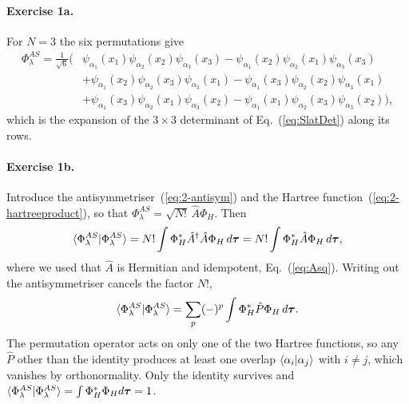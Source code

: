 \paragraph{Exercise 1a.}
For $N=3$ the six permutations give
\begin{align}
  \Phi_{\lambda}^{AS} = \frac{1}{\sqrt{6}}\Big(
  &\psi_{\alpha_1}(x_1)\psi_{\alpha_2}(x_2)\psi_{\alpha_3}(x_3)
  -\psi_{\alpha_1}(x_2)\psi_{\alpha_2}(x_1)\psi_{\alpha_3}(x_3)\nonumber\\
  &+\psi_{\alpha_1}(x_2)\psi_{\alpha_2}(x_3)\psi_{\alpha_3}(x_1)
  -\psi_{\alpha_1}(x_3)\psi_{\alpha_2}(x_2)\psi_{\alpha_3}(x_1)\nonumber\\
  &+\psi_{\alpha_1}(x_3)\psi_{\alpha_2}(x_1)\psi_{\alpha_3}(x_2)
  -\psi_{\alpha_1}(x_1)\psi_{\alpha_2}(x_3)\psi_{\alpha_3}(x_2)\Big),
  \label{eq:2-w35a}
\end{align}
which is the expansion of the $3\times3$ determinant of
Eq.~(\ref{eq:SlatDet}) along its rows.

\paragraph{Exercise 1b.}
Introduce the antisymmetriser~(\ref{eq:2-antisym}) and the Hartree
function~(\ref{eq:2-hartreeproduct}), so that
$\Phi^{AS}_{\lambda}=\sqrt{N!}\,\hat{A}\Phi_H$.  Then
\begin{equation}
  \langle \Phi^{AS}_{\lambda} \vert \Phi^{AS}_{\lambda} \rangle
   = N!\int \Phi_H^{*}\hat{A}^{\dagger}\hat{A}\Phi_H\,d\bm{\tau}
   = N!\int \Phi_H^{*}\hat{A}\Phi_H\,d\bm{\tau} ,
  \label{eq:2-w35b1}
\end{equation}
where we used that $\hat{A}$ is Hermitian and idempotent,
Eq.~(\ref{eq:Asq}).  Writing out the antisymmetriser cancels the factor $N!$,
\begin{equation}
  \langle \Phi^{AS}_{\lambda} \vert \Phi^{AS}_{\lambda} \rangle
   = \sum_{p}(-)^{p}\int \Phi_H^{*}\hat{P}\Phi_H\,d\bm{\tau} .
  \label{eq:2-w35b2}
\end{equation}
The permutation operator acts on only one of the two Hartree functions, so
any $\hat{P}$ other than the identity produces at least one overlap
$\langle \alpha_i \vert \alpha_j \rangle$ with $i\ne j$, which vanishes by
orthonormality.  Only the identity survives and
$\langle \Phi^{AS}_{\lambda} \vert \Phi^{AS}_{\lambda} \rangle=\int\Phi_H^{*}\Phi_H
d\bm{\tau}=1$.

